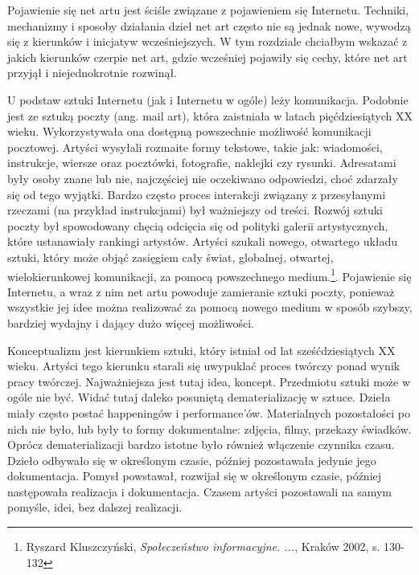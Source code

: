 \documentclass[a4paper,12pt,twoside]{article}
\begin{document}
Pojawienie się net artu jest ściśle związane z pojawieniem się Internetu.
Techniki, mechanizmy i sposoby działania dzieł net art często nie są
jednak nowe, wywodzą się z kierunków i inicjatyw wcześniejszych.
W tym rozdziale chciałbym wskazać z jakich kierunków czerpie net art,
gdzie wcześniej pojawiły się cechy, które net art przyjął i niejednokrotnie
rozwinął.

U podstaw sztuki Internetu (jak i Internetu w ogóle) leży komunikacja.
Podobnie jest ze sztuką poczty (ang. mail art), która zaistniała w latach
pięćdziesiątych XX wieku. Wykorzystywała ona dostępną powszechnie możliwość
komunikacji pocztowej. Artyści wysyłali rozmaite formy tekstowe, takie jak:
wiadomości, instrukcje, wiersze oraz pocztówki, fotografie, naklejki czy
rysunki. Adresatami były osoby znane lub nie, najczęściej nie oczekiwano
odpowiedzi, choć zdarzały się od tego wyjątki. Bardzo często proces
interakcji związany z przesyłanymi rzeczami (na przykład instrukcjami)
był ważniejszy od treści. Rozwój sztuki poczty był
spowodowany chęcią odcięcia się od polityki galerii artystycznych, które
ustanawiały rankingi artystów. Artyści szukali nowego, otwartego układu
sztuki, który może objąć zasięgiem cały świat, globalnej, otwartej,
wielokierunkowej komunikacji, za pomocą powszechnego
medium.\footnote{ Ryszard Kluszczyński,
\textit{Społeczeństwo informacyjne. ...}, Kraków 2002, s. 130-132}.
Pojawienie się Internetu, a wraz z nim net artu powoduje zamieranie sztuki
poczty, ponieważ wszystkie jej idee można realizować za pomocą nowego medium
w sposób szybszy, bardziej wydajny i dający dużo więcej możliwości.

Konceptualizm jest kierunkiem sztuki, który istniał od lat sześćdziesiątych
XX wieku. Artyści tego kierunku starali się uwypuklać proces twórczy
ponad wynik pracy twórczej. Najważniejsza jest tutaj idea, koncept.
Przedmiotu sztuki może w ogóle nie być. Widać tutaj daleko posuniętą
dematerializację w sztuce. Dzieła miały często postać happeningów
i performance'ów. Materialnych pozostałości po nich nie było, lub były
to formy dokumentalne: zdjęcia, filmy, przekazy świadków. Oprócz
dematerializacji bardzo istotne było również włączenie
czynnika czasu. Dzieło odbywało się w określonym czasie, później pozostawała
jedynie jego dokumentacja. Pomysł powstawał, rozwijał się w określonym czasie,
później następowała realizacja i dokumentacja. Czasem artyści pozostawali
na samym pomyśle, idei, bez dalszej realizacji.
\end{document}
